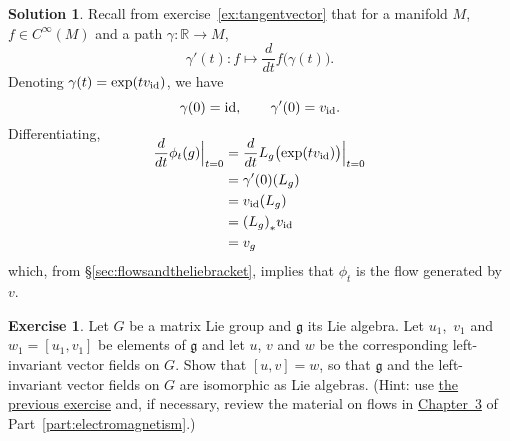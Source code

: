 \documentclass[11pt, a4paper]{report}
\theoremstyle{definition}
\newtheorem{exercise}{Exercise}[part]
\newtheorem{solution}{Solution}[part]
\newenvironment{ex}{\begin{exercise}}{\end{exercise}\pagebreak[1]}
\newenvironment{sol}{\begin{solution}}{\end{solution}\pagebreak[3]}
\newcommand*{\id}{\ensuremath\mathop{}\mathopen{}\mathrm{id}}
\begin{document}
\begin{sol}

Recall from exercise~\ref{ex:tangentvector} that for a manifold $M$, $f \in C^\infty(M)$ and a path $\gamma: \mathbb{R} \to M$,
\[
    \gamma'(t): f \mapsto \frac{d}{dt} f\bigl(\gamma(t)\bigr).
\]
Denoting $\gamma(t) = \exp(tv_{\id})$, we have
\[
    \gamma(0) = \id, \qquad
    \gamma'(0) = v_{\id}.
\]
Differentiating,
\begin{align*}
    \SwapAboveDisplaySkip
    \frac{d}{dt} \phi_t(g) \Big|_{t = 0} &= \frac{d}{dt} L_g\bigl(\exp(tv_{\id}) \bigr) \Big|_{t = 0} \\
        &= \gamma'(0) (L_g) \\
        &= v_{\id}(L_g) \\
        &= {(L_g)}_* v_{\id} \\
        &= v_g
\end{align*}
which, from \S\ref{sec:flowsandtheliebracket}, implies that $\phi_t$ is the flow generated by $v$.

\end{sol}

\begin{ex}

Let $G$ be a matrix Lie group and $\mathfrak{g}$ its Lie algebra.
Let $u_1$,~$v_1$ and $w_1 = [u_1, v_1]$ be elements of $\mathfrak{g}$ and let $u$, $v$ and $w$ be the corresponding left-invariant vector fields on $G$.
Show that $[u, v] = w$, so that $\mathfrak{g}$ and the left-invariant vector fields on $G$ are isomorphic as Lie algebras.
(Hint: use \hyperref[ex:liealgebraflow]{the previous exercise} and, if necessary, review the material on flows in \hyperref[ch:vectorfields]{Chapter~3} of Part~\ref{part:electromagnetism}.)

\end{ex}
\end{document}
